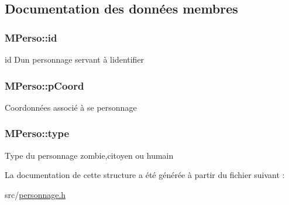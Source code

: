 \subsection{Documentation des données membres}
\subsubsection[{\texorpdfstring{id}{id}}]{\setlength{\rightskip}{0pt plus 5cm}M\+Perso\+::id}\hypertarget{structMPerso_af6a4c47de69856669b2f1810d4c870e7}{}\label{structMPerso_af6a4c47de69856669b2f1810d4c870e7}
id D\textquotesingle{}un personnage servant à l\textquotesingle{}identifier 
\subsubsection[{\texorpdfstring{p\+Coord}{pCoord}}]{\setlength{\rightskip}{0pt plus 5cm}M\+Perso\+::p\+Coord}\hypertarget{structMPerso_afcc7996dea19cc509e8bda2725fa8c3b}{}\label{structMPerso_afcc7996dea19cc509e8bda2725fa8c3b}
Coordonnées associé à se personnage 
\subsubsection[{\texorpdfstring{type}{type}}]{\setlength{\rightskip}{0pt plus 5cm}M\+Perso\+::type}\hypertarget{structMPerso_a476ff327af93f97f1ae6408e2ebc1986}{}\label{structMPerso_a476ff327af93f97f1ae6408e2ebc1986}
Type du personnage zombie,citoyen ou humain 

La documentation de cette structure a été générée à partir du fichier suivant \+:\begin{DoxyCompactItemize}
\item 
src/\hyperlink{personnage_8h}{personnage.\+h}\end{DoxyCompactItemize}
